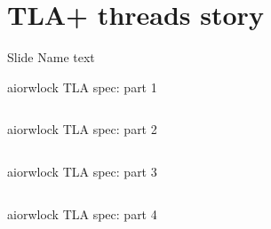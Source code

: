 \documentclass[12pt]{beamer}
\begin{document}
  \section{TLA+ threads story}
  \begin{frame}{Slide Name}
      text
  \end{frame}
  \begin{frame}{aiorwlock TLA spec: part 1}
      \begin{center}
          \inputminted[firstline=1,lastline=19,linenos,fontsize=\scriptsize]{tla}{figures/aiorwlock.tla}
      \end{center}
  \end{frame}
  \begin{frame}{aiorwlock TLA spec: part 2}
      \begin{center}
          \inputminted[firstline=20,lastline=31,linenos,fontsize=\scriptsize]{tla}{figures/aiorwlock.tla}
      \end{center}
  \end{frame}
  \begin{frame}{aiorwlock TLA spec: part 3}
      \begin{center}
          \inputminted[firstline=34,lastline=47,linenos,fontsize=\scriptsize]{tla}{figures/aiorwlock.tla}
      \end{center}
  \end{frame}
  \begin{frame}{aiorwlock TLA spec: part 4}
      \begin{center}
          \inputminted[firstline=47,lastline=58,linenos,fontsize=\scriptsize]{tla}{figures/aiorwlock.tla}
      \end{center}
  \end{frame}
\end{document}
